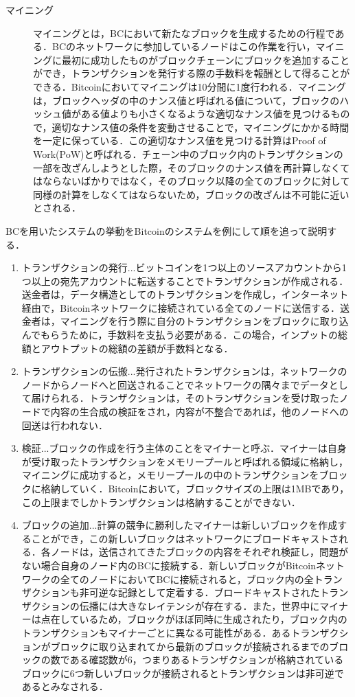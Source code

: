 \documentclass[japanese, macos]{KU2}
\begin{document}
\begin{description}
\item[マイニング] マイニングとは，BCにおいて新たなブロックを生成するための行程である．BCのネットワークに参加しているノードはこの作業を行い，マイニングに最初に成功したものがブロックチェーンにブロックを追加することができ，トランザクションを発行する際の手数料を報酬として得ることができる．Bitcoinにおいてマイニングは10分間に1度行われる．マイニングは，ブロックヘッダの中のナンス値と呼ばれる値について，ブロックのハッシュ値がある値よりも小さくなるような適切なナンス値を見つけるもので，適切なナンス値の条件を変動させることで，マイニングにかかる時間を一定に保っている．この適切なナンス値を見つける計算はProof of Work(PoW)と呼ばれる．チェーン中のブロック内のトランザクションの一部を改ざんしようとした際，そのブロックのナンス値を再計算しなくてはならないばかりではなく，そのブロック以降の全てのブロックに対して同様の計算をしなくてはならないため，ブロックの改ざんは不可能に近いとされる．
\end{description}

BCを用いたシステムの挙動をBitcoinのシステムを例にして順を追って説明する．
\begin{enumerate}
\item トランザクションの発行...ビットコインを1つ以上のソースアカウントから1つ以上の宛先アカウントに転送することでトランザクションが作成される．送金者は，データ構造としてのトランザクションを作成し，インターネット経由で，Bitcoinネットワークに接続されている全てのノードに送信する．送金者は，マイニングを行う際に自分のトランザクションをブロックに取り込んでもらうために，手数料を支払う必要がある．この場合，インプットの総額とアウトプットの総額の差額が手数料となる．
\item トランザクションの伝搬...発行されたトランザクションは，ネットワークのノードからノードへと回送されることでネットワークの隅々までデータとして届けられる．トランザクションは，そのトランザクションを受け取ったノードで内容の生合成の検証をされ，内容が不整合であれば，他のノードへの回送は行われない．
\item 検証...ブロックの作成を行う主体のことをマイナーと呼ぶ．マイナーは自身が受け取ったトランザクションをメモリープールと呼ばれる領域に格納し，マイニングに成功すると，メモリープールの中のトランザクションをブロックに格納していく．Bitcoinにおいて，ブロックサイズの上限は1MBであり，この上限までしかトランザクションは格納することができない．
\item ブロックの追加...計算の競争に勝利したマイナーは新しいブロックを作成することができ，この新しいブロックはネットワークにブロードキャストされる．各ノードは，送信されてきたブロックの内容をそれぞれ検証し，問題がない場合自身のノード内のBCに接続する．新しいブロックがBitcoinネットワークの全てのノードにおいてBCに接続されると，ブロック内の全トランザクションも非可逆な記録として定着する．ブロードキャストされたトランザクションの伝播には大きなレイテンシが存在する．また，世界中にマイナーは点在しているため，ブロックがほぼ同時に生成されたり，ブロック内のトランザクションもマイナーごとに異なる可能性がある．あるトランザクションがブロックに取り込まれてから最新のブロックが接続されるまでのブロックの数である確認数が6，つまりあるトランザクションが格納されているブロックに6つ新しいブロックが接続されるとトランザクションは非可逆であるとみなされる．
\end{enumerate} 
\end{document}
